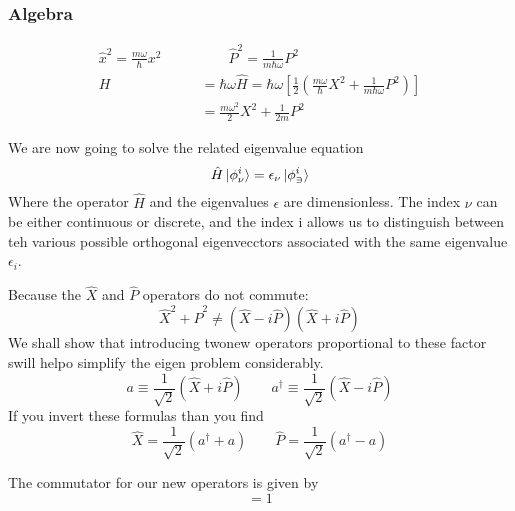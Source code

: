 \documentclass{article}
\newcommand{\be}{\begin{equation}}
\newcommand{\ee}{\end{equation}}
\newcommand{\dg}{\dagger}
\begin{document}
\subsubsection*{Algebra}
\be
\begin{split}
    \hat{x}^2= \frac{m\omega}{\hbar}x^2 \qquad & \qquad \hat{P}^2 = \frac{1}{m\hbar\omega}P^2 \\
    H &= \hbar\omega\hat{H} = \hbar\omega \left[\frac{1}{2} \left(\frac{m\omega}{\hbar} X^2 + \frac{1}{m\hbar\omega}P^2\right)\right]\\
    &= \frac{m\omega^2}{2} X^2 + \frac{1}{2m}P^2
\end{split}
\ee

We are now going to solve the related eigenvalue equation
\be
\hat{H}\ket{\phi_\nu^i} = \epsilon_\nu \ket{\phi_\ni^i}
\ee
Where the operator $\hat{H}$ and the eigenvalues $\epsilon$ are dimensionless. 
The index $\nu$ can be either continuous or discrete, and the index i allows us to distinguish between teh various possible orthogonal eigenvecctors associated with the same eigenvalue $\epsilon_i$. 

Because the $\hat{X}$ and $\hat{P}$ operators do  not commute:
\be
\hat{X}^2 + \hat{P}^2 \neq (\hat{X} - i\hat{P})(\hat{X} + i\hat{P})
\ee
We shall show that introducing twonew  operators proportional to these  factor swill helpo simplify the eigen problem considerably. 
\be
a \equiv \frac{1}{\sqrt{2}} (\hat{X} + i\hat{P}) \qquad a^\dg \equiv \frac{1}{\sqrt{2}} (\hat{X} - i\hat{P})
\ee
If  you invert these formulas than you find
\be
\hat{X} = \frac{1}{\sqrt{2}} (a^\dg + a) \qquad \hat{P} = \frac{1}{\sqrt{2}} (a^\dg - a)
\ee

The commutator for our new operators is given by
\be
[a,a^\dg] = 1
\ee
\end{document}
